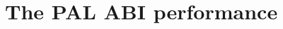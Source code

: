 \section{The PAL ABI performance}
\label{sec:eval:pal}

\makeatletter
{}
\makeatother
\graphicspath{{eval/pal/figures/}}










\makeatletter
{}
\makeatother
\graphicspath{{eval/figures/}}
